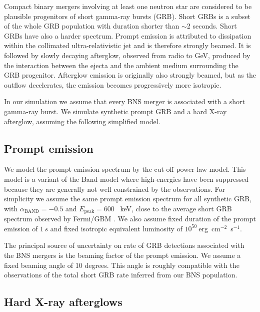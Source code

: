 \documentclass[11pt]{article}
\begin{document}
Compact binary mergers involving at least one neutron star are considered to be
plausible progenitors of short gamma-ray bursts (GRB). Short GRBs is a
subset of the whole GRB population with duration shorter than $\sim$2
seconds. Short GRBs have also a harder spectrum. Prompt emission is attributed
to dissipation within the collimated ultra-relativistic jet and is therefore
strongly beamed. It is followed by slowly decaying afterglow, observed from
radio to GeV, produced by the interaction between the ejecta and the ambient
medium surrounding the GRB progenitor. Afterglow emission is originally also
strongly beamed, but as the outflow decelerates, the emission becomes
progressively more isotropic.

In our simulation we assume that every BNS merger is associated with a short
gamma-ray burst. We simulate synthetic prompt GRB and a hard X-ray afterglow,
assuming the following simplified model.

\subsection*{Prompt emission}
We model the prompt emission spectrum by the cut-off power-law model. This
model is a variant of the Band model \citep{1993ApJ...413..281B} where high-energies have
been suppressed because they are generally not well constrained by the
observations. For simplicity we assume the same prompt emission spectrum
for all synthetic GRB, with $\alpha_{\mathrm{BAND}} = - 0.5$ and
$E_{\mathrm{peak}} = 600$ \, keV, close to the average short GRB spectrum
observed by Fermi/GBM \citep{2014ApJS..211...12G}.  
We also assume
fixed duration of the prompt emission of $1 \, s$ and fixed isotropic equivalent
luminosity of $10^{50}~$erg~cm$^{-2}$~s$^{-1}$.

The principal source of uncertainty on rate of GRB detections associated with
the BNS mergers is the beaming factor of the prompt emission. We assume a fixed
beaming angle of 10 degrees. This angle is roughly compatible with the
observations of the total short GRB rate inferred from our BNS population.

\subsection*{Hard X-ray afterglows}
\end{document}
